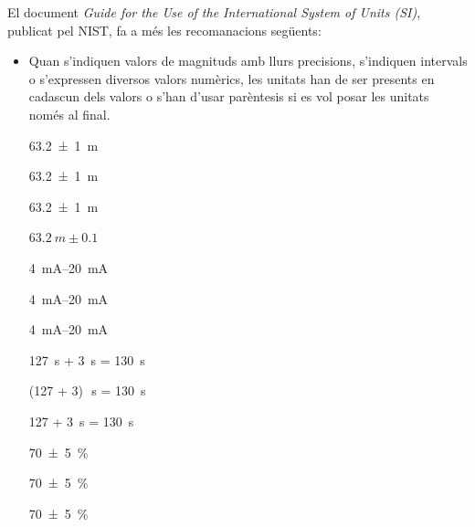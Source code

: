El document  \textit{Guide for the Use of the International System of Units (SI)}, publicat pel NIST,  fa a més les recomanacions següents:

\begin{itemize}

\item Quan s'indiquen valors de magnituds amb llurs precisions,
s'indiquen intervals o s'expressen diversos valors numèrics, les
unitats han de ser presents en cadascun dels valors o s'han d'usar
parèntesis si es vol posar les unitats només al final.

\textcolor{Green}\faCheckSquare{} \qty[separate-uncertainty, separate-uncertainty-units = repeat]{63,2(1)}{m}

\textcolor{Green}\faCheckSquare{} \qty[separate-uncertainty]{63,2(1)}{m}

\textcolor{Blue}\faExclamationTriangle{} \qty[separate-uncertainty, separate-uncertainty-units = single]{63,2(1)}{m}

\textcolor{Blue}\faExclamationTriangle{}  $\qty{63,2}{m} \pm \num{0,1}$


\textcolor{Green}\faCheckSquare{} \qtyrange{4}{20}{mA}

\textcolor{Green}\faCheckSquare{} \qtyrange[range-units = bracket]{4}{20}{mA}

\textcolor{Blue}\faExclamationTriangle{} \qtyrange[range-units = single]{4}{20}{mA}


\textcolor{Green}\faCheckSquare{} 

\textcolor{Green}\faCheckSquare{} 

\textcolor{Blue}\faExclamationTriangle{} 


\textcolor{Green}\faCheckSquare{} \qty{127}{s} + \qty{3}{s} = \qty{130}{s}

\textcolor{Green}\faCheckSquare{}  (127 + 3)\unit{\,s} = \qty{130}{s}

\textcolor{Blue}\faExclamationTriangle{}  127 + \qty{3}{s} = \qty{130}{s}


\textcolor{Green}\faCheckSquare{} \qty[separate-uncertainty, separate-uncertainty-units = repeat]{70(5)}{\percent}

\textcolor{Green}\faCheckSquare{} \qty[separate-uncertainty]{70(5)}{\percent}

\textcolor{Blue}\faExclamationTriangle{} \qty[separate-uncertainty, separate-uncertainty-units = single]{70(5)}{\percent}



\end{itemize}
